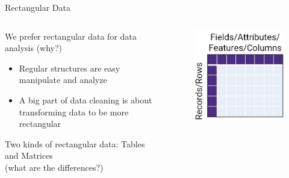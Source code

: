 \documentclass[aspectratio=169]{../latex_main/tntbeamer}  %
\begin{document}
	
	
	\begin{frame}{Rectangular Data}
	   \begin{columns}
	   
	   
	   \begin{column}{.7\textwidth}
	    
	   
	    We prefer rectangular data for data analysis (why?)
	    \begin{itemize}
	        \item Regular structures are easy manipulate and analyze
	        \item A big part of data cleaning is about transforming data to be more rectangular
	    \end{itemize}
	    
        Two kinds of rectangular data: Tables and Matrices \\
		\centering	(what are the differences?)
		\end{column}
		
	   \begin{column}{.3\textwidth}
	   \begin{figure}
	       		    \includegraphics[scale=.3]{Bild8}
	   \end{figure}

		\end{column}
		\end{columns}
	\end{frame}
	
\end{document}

